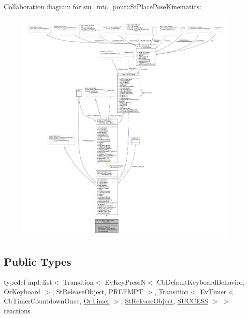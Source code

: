 Collaboration diagram for sm\+\_\+mtc\+\_\+pour\+:\+:St\+Place\+Pose\+Kinematics\+:
\nopagebreak
\begin{figure}[H]
\begin{center}
\leavevmode
\includegraphics[width=350pt]{structsm__mtc__pour_1_1StPlacePoseKinematics__coll__graph}
\end{center}
\end{figure}
\subsection*{Public Types}
\begin{DoxyCompactItemize}
\item 
typedef mpl\+::list$<$ Transition$<$ Ev\+Key\+PressN$<$ Cb\+Default\+Keyboard\+Behavior, \hyperlink{classsm__mtc__pour_1_1OrKeyboard}{Or\+Keyboard} $>$, \hyperlink{structsm__mtc__pour_1_1StReleaseObject}{St\+Release\+Object}, \hyperlink{classPREEMPT}{P\+R\+E\+E\+M\+PT} $>$, Transition$<$ Ev\+Timer$<$ Cb\+Timer\+Countdown\+Once, \hyperlink{classsm__mtc__pour_1_1OrTimer}{Or\+Timer} $>$, \hyperlink{structsm__mtc__pour_1_1StReleaseObject}{St\+Release\+Object}, \hyperlink{classSUCCESS}{S\+U\+C\+C\+E\+SS} $>$ $>$ \hyperlink{structsm__mtc__pour_1_1StPlacePoseKinematics_ace05ebd485c04ce1d4b81b24bf6d2306}{reactions}
\end{DoxyCompactItemize}
